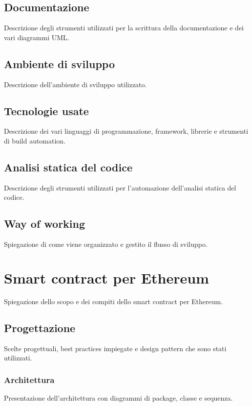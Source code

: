 \subsection{Documentazione}
Descrizione degli strumenti utilizzati per la scrittura della documentazione e dei vari diagrammi UML.

\subsection{Ambiente di sviluppo}
Descrizione dell'ambiente di sviluppo utilizzato.

\subsection{Tecnologie usate}
Descrizione dei vari linguaggi di programmazione, framework, librerie e strumenti di build automation.

\subsection{Analisi statica del codice}
Descrizione degli strumenti utilizzati per l'automazione dell'analisi statica del codice.

\subsection{Way of working}
Spiegazione di come viene organizzato e gestito il flusso di sviluppo.





\section{Smart contract per Ethereum}
Spiegazione dello scopo e dei compiti dello smart contract per Ethereum.

\subsection{Progettazione}
Scelte progettuali, best practices impiegate e design pattern che sono stati utilizzati. 

\subsubsection{Architettura}
Presentazione dell'architettura con diagrammi di package, classe e sequenza.

